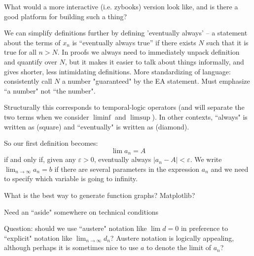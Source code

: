 What would a more interactive (i.e. zybooks) version look like, and is there a good platform for building such a thing?

We can simplify definitions further by defining 'eventually always' -- a statement about the terms of $x_n$ is ``eventually always true'' if there exists $N$ such that it is true for all $n>N$. In proofs we always need to immediately unpack definition and quantify over $N$, but it makes it easier to talk about things informally, and gives shorter, less intimidating definitions. More standardizing of language: consistently call $N$  a number "guaranteed" by the EA statement. Must emphasize ``a number" not ``the number".

Structurally this corresponds to temporal-logic operators (and will separate the two terms when we consider $\liminf$ and $\limsup$). In other contexts, ``always" is written as (square) and ``eventually" is written as (diamond).

So our first definition becomes: 
\[
\lim a_n = A
\]
if and only if, given any $\varepsilon > 0$, eventually always $|a_n - A| < \varepsilon$. We write $\lim_{n \to \infty} a_n = b$ if there are several parameters in the expression $a_n$ and we need to specify which variable is going to infinity.


What is the best way to generate function graphs? Matplotlib?

Need an ``aside" somewhere on technical conditions



Question: should we use ``austere" notation like $\lim d = 0$ in preference to ``explicit" notation like $\lim_{n \to \infty} d_n$? Austere notation is logically appealing, although perhaps it is sometimes nice to use $a$ to denote the limit of $a_n$?


